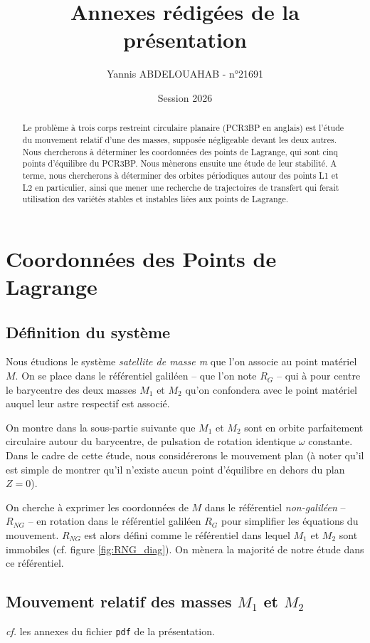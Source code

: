 \documentclass[12pt]{article}
\title{Annexes rédigées de la présentation}
\author{Yannis ABDELOUAHAB - n°21691}
\date{Session 2026}
\theoremstyle{definition}
\theoremstyle{definition}
\begin{document}
	\maketitle
	\tableofcontents
	
	\begin{abstract}
		Le problème à trois corps restreint circulaire planaire (PCR3BP en anglais) est l'étude du mouvement relatif d'une des masses, supposée négligeable devant les deux autres. Nous chercherons à déterminer les coordonnées des points de Lagrange, qui sont cinq points d'équilibre du PCR3BP. Nous mènerons ensuite une étude de leur stabilité. A terme, nous chercherons à déterminer des orbites périodiques autour des points L1 et L2 en particulier, ainsi que mener une recherche de trajectoires de transfert qui ferait utilisation des variétés stables et instables liées aux points de Lagrange.
	\end{abstract}
	
	\section{Coordonnées des Points de Lagrange}
	\subsection{Définition du système}
	\label{def_system}
	Nous étudions le système \emph{satellite de masse m} que l'on associe au point matériel $M$. On se place dans le référentiel galiléen -- que l'on note $R_G$ -- qui à pour centre le barycentre des deux masses $M_1$ et $M_2$ qu'on confondera avec le point matériel auquel leur astre respectif est associé.
	
	On montre dans la sous-partie suivante que $M_1$ et $M_2$ sont en orbite parfaitement circulaire autour du barycentre, de pulsation de rotation identique $\omega$ constante. Dans le cadre de cette étude, nous considérerons le mouvement plan (à noter qu'il est simple de montrer qu'il n'existe aucun point d'équilibre en dehors du plan $Z=0$).
	
	On cherche à exprimer les coordonnées de $M$ dans le référentiel \textit{non-galiléen} -- $R_{NG}$ -- en rotation dans le référentiel galiléen $R_G$ pour simplifier les équations du mouvement. $R_{NG}$ est alors défini comme le référentiel dans lequel $M_1$ et $M_2$ sont immobiles (cf. figure \ref{fig:RNG_diag}). On mènera la majorité de notre étude dans ce référentiel.
	
	\subsection{Mouvement relatif des masses $M_1$ et $M_2$}
	\textit{cf.} les annexes du fichier \verb|pdf| de la présentation.
	
\end{document}

